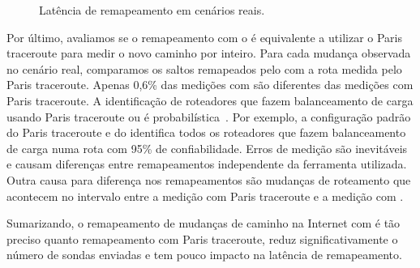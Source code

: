 \begin{figure}
\begin{center}
\hspace{2mm}
\caption{Latência de remapeamento em cenários reais.}
\end{center}
\end{figure}

Por último, avaliamos se o remapeamento com o \rmprt{} é equivalente a
utilizar o Paris traceroute para medir o novo caminho por inteiro.  Para
cada mudança observada no cenário real, comparamos os saltos remapeados
pelo \rmprt{} com a rota medida pelo Paris traceroute.  Apenas 0,6\% das
medições com \rmprt{} são diferentes das medições com Paris traceroute.
A identificação de roteadores que fazem balanceamento de carga usando
Paris traceroute ou \rmprt{} é probabilística~\cite{veitch09balancer}.
Por exemplo, a configuração padrão do Paris traceroute e do \rmprt{}
identifica todos os roteadores que fazem balanceamento de carga numa
rota com 95\% de confiabilidade.  Erros de medição são inevitáveis e
causam diferenças entre remapeamentos independente da ferramenta
utilizada.  Outra causa para diferença nos remapeamentos são mudanças de
roteamento que acontecem no intervalo entre a medição com Paris
traceroute e a medição com \rmprt{}.

Sumarizando, o remapeamento de mudanças de caminho na Internet com
\rmprt{} é tão preciso quanto remapeamento com Paris traceroute, reduz
significativamente o número de sondas enviadas e tem pouco impacto na
latência de remapeamento.


